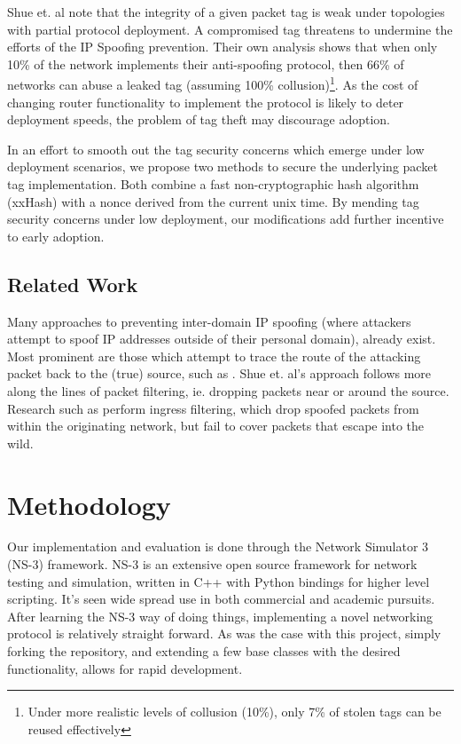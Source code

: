\documentclass[12pt]{article} %
\begin{document}
Shue et. al note that the integrity of a given packet tag is weak under topologies with partial protocol deployment. A compromised tag threatens to undermine the efforts of the IP Spoofing prevention. Their own analysis shows that when only 10\% of the network implements their anti-spoofing protocol, then 66\% of networks can abuse a leaked tag (assuming 100\% collusion)\cite{Shue20081567}\footnote{Under more realistic levels of collusion (10\%), only 7\% of stolen tags can be reused effectively}. As the cost of changing router functionality to implement the protocol is likely to deter deployment speeds, the problem of tag theft may discourage adoption.

In an effort to smooth out the tag security concerns which emerge under low deployment scenarios, we propose two methods to secure the underlying packet tag implementation. Both combine a fast non-cryptographic hash algorithm (xxHash) with a nonce derived from the current unix time. By mending tag security concerns under low deployment, our modifications add further incentive to early adoption.

\subsection{Related Work}
Many approaches to preventing inter-domain IP spoofing (where attackers attempt to spoof IP addresses outside of their personal domain), already exist. Most prominent are those which attempt to trace the route of the attacking packet back to the (true) source, such as \cite{Taylor}. Shue et. al's approach follows more along the lines of packet filtering, ie. dropping packets near or around the source. Research such as \cite{rfc2827} perform ingress filtering, which drop spoofed packets from within the originating network, but fail to cover packets that escape into the wild.

\section{Methodology}

Our implementation and evaluation is done through the Network Simulator 3 (NS-3) framework. NS-3 is an extensive open source framework for network testing and simulation, written in C++ with Python bindings for higher level scripting. It's seen wide spread use in both commercial and academic pursuits. After learning the NS-3 way of doing things, implementing a novel networking protocol is relatively straight forward. As was the case with this project, simply forking the repository, and extending a few base classes with the desired functionality, allows for rapid development.
\end{document}
